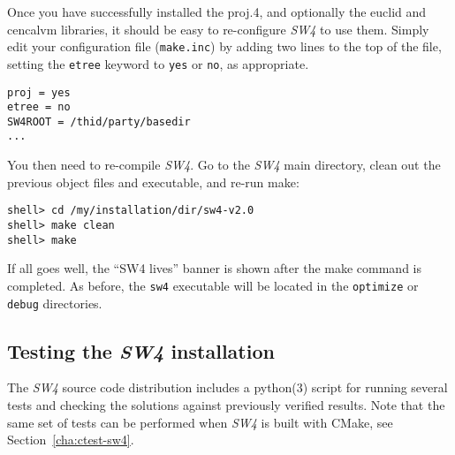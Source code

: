 \documentclass[11pt]{article}
\begin{document}
Once you have successfully installed the proj.4, and optionally the euclid and cencalvm libraries,
it should be easy to re-configure \emph{SW4} to use them. Simply edit your configuration file
(\verb+make.inc+) by adding two lines to the top of the file, setting the {\tt etree} keyword to
{\tt yes} or {\tt no}, as appropriate.
\begin{verbatim}
proj = yes
etree = no
SW4ROOT = /thid/party/basedir
...
\end{verbatim}
You then need to re-compile \emph{SW4}. Go to the \emph{SW4} main directory, clean out the previous
object files and executable, and re-run make:
\begin{verbatim}
shell> cd /my/installation/dir/sw4-v2.0
shell> make clean
shell> make
\end{verbatim}
If all goes well, the ``SW4 lives'' banner is shown after the make command is
completed. As before, the \verb+sw4+ executable will be located in the \verb+optimize+ or
\verb+debug+ directories.

\subsection{Testing the \emph{SW4} installation}
The \emph{SW4} source code distribution includes a python(3) script for running several tests and
checking the solutions against previously verified results. Note that the same set of tests can be
performed when \emph{SW4} is built with CMake, see Section~\ref{cha:ctest-sw4}.
\end{document}
